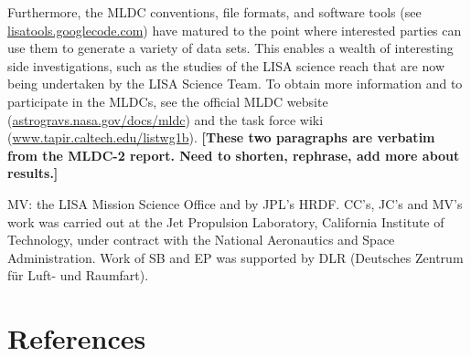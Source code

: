 \documentclass{iopart}
\begin{document}
Furthermore, the MLDC conventions, file formats, and software tools (see \url{lisatools.googlecode.com}) have matured to the point where interested parties can use them to generate a variety of data sets. This enables a wealth of interesting side investigations, such as the studies of the LISA science reach that are now being undertaken by the LISA Science Team. To obtain more information and to participate in the MLDCs, see the official MLDC website (\url{astrogravs.nasa.gov/docs/mldc}) and the task force wiki (\url{www.tapir.caltech.edu/listwg1b}).
\textbf{[These two paragraphs are verbatim from the MLDC-2 report. Need to shorten, rephrase, add more about results.]}

\ack

MV: the LISA Mission Science Office and by JPL's HRDF.
CC's, JC's and MV's work was carried out at the Jet Propulsion Laboratory, California Institute of Technology, under contract with the National Aeronautics and Space Administration. Work of SB and EP was supported by DLR (Deutsches Zentrum f\"ur Luft- und Raumfart).



\section*{References}
\end{document}
